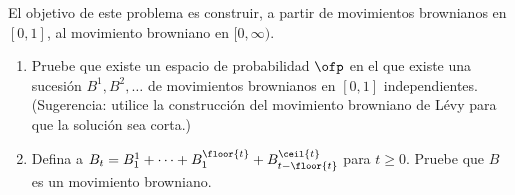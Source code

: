 \begin{problema}
	El objetivo de este problema es construir, a partir de movimientos brownianos en $[0,1]$, al movimiento browniano en $[0,\infty)$.
	\begin{enumerate}
		\item 
			Pruebe que existe un espacio de probabilidad $\ofp$ en el que existe 
			una sucesi\'on $B^1,B^2,\ldots$ de movimientos brownianos en $[0,1]$ 
			independientes. (Sugerencia: utilice la construcci\'on del movimiento 
			browniano de L\'evy  para que la soluci\'on sea corta.)
			
		\item 
			Defina a $B_t=B^1_1+\cdots+B^{\floor{t}}_1+B^{\ceil{t}}_{t-\floor{t}}$ 
			para $t\geq 0$. Pruebe que $B$ es un movimiento browniano. 
		
	\end{enumerate}
\end{problema}